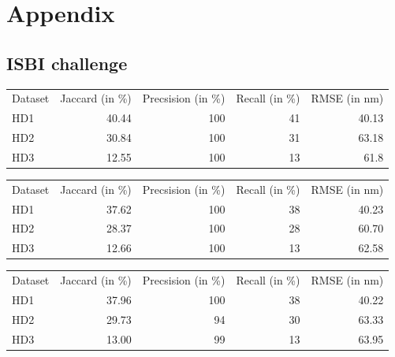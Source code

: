 \chapter{Appendix}


\listoffigures
\listoftables

\section{ISBI challenge}

\begin{center}
\label{reshd1}%
\begin{tabular}{lrrrr}
Dataset&Jaccard (in \%)&Precsision (in \%)& Recall (in \%) & RMSE (in nm)\\
HD1&40.44&100&41&40.13\\
HD2&30.84&100&31&63.18\\
HD3&12.55&100&13&61.8
\end{tabular} 

\end{center}


\begin{center}
\label{reshd2}
\begin{tabular}{lrrrr}
Dataset&Jaccard (in \%)&Precsision (in \%)& Recall (in \%) & RMSE (in nm)\\
HD1&37.62&100&38&40.23\\
HD2&28.37&100&28&60.70\\
HD3&12.66&100&13&62.58
\end{tabular}
\end{center}

\begin{center}
\label{reshd3}
\begin{tabular}{lrrrr}
Dataset&Jaccard (in \%)&Precsision (in \%)& Recall (in \%) & RMSE (in nm)\\
HD1&37.96&100&38&40.22\\
HD2&29.73&94&30&63.33\\
HD3&13.00&99&13&63.95
\end{tabular}
\end{center}



